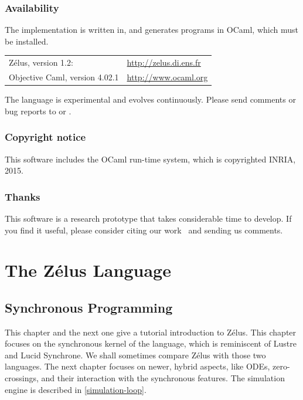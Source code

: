 \documentclass[11pt,titlepage,twoside]{report}
\newcommand{\zelus}{{\sf Z\'elus}}
\newcommand{\lustre}{{\sf Lustre}}
\newcommand{\lucy}{{\sf Lucid Synchrone}}
\newcommand{\ocaml}{{\sf OCaml}}
\begin{document}
\section*{Availability\label{availability}}
The implementation is written in, and generates programs in \ocaml, which 
must be installed.
\begin{center}
\begin{tabular}{ll}
  \zelus, version 1.2:  & \url{http://zelus.di.ens.fr} \\
  Objective Caml, version 4.02.1  & \url{http://www.ocaml.org}
\end{tabular}
\end{center}
The language is experimental and evolves continuously. Please send
comments or bug reports to  or 
. 

\section*{Copyright notice\label{copyright}}
This software includes the \ocaml{} run-time system, which is
copyrighted INRIA, 2015. 

\section*{Thanks\label{thanks}}

This software is a research prototype that takes considerable time to 
develop.
If you find it useful, please consider citing our work~\cite{lucy:hscc13} 
and sending us comments.

\cleardoublepage
\part{The Z\'elus Language\label{zeluslang}}
\cleardoublepage
\chapter{Synchronous Programming\label{syncprog}} %

This chapter and the next one give a tutorial introduction to \zelus. This
chapter focuses on the synchronous kernel of the language, which is 
reminiscent of \lustre{} and \lucy.
We shall sometimes compare \zelus{} with those two languages.
The next chapter focuses on newer, hybrid aspects, like ODEs,
zero-crossings, and their interaction with the synchronous features.
The simulation engine is described in \cref{simulation-loop}.
\end{document}
